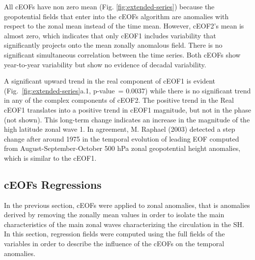 \documentclass[smallextended]{svjour3}       %
\begin{document}
All cEOFs have non zero mean (Fig. \ref{fig:extended-series}) because the geopotential fields that enter into the cEOFs algorithm are anomalies with respect to the zonal mean instead of the time mean.
However, cEOF2's mean is almost zero, which indicates that only cEOF1 includes variability that significantly projects onto the mean zonally anomalous field.
There is no significant simultaneous correlation between the time series.
Both cEOFs show year-to-year variability but show no evidence of decadal variability.

A significant upward trend in the real component of cEOF1 is evident (Fig.~\ref{fig:extended-series}a.1, p-value~= 0.0037) while there is no significant trend in any of the complex components of cEOF2.
The positive trend in the Real cEOF1 translates into a positive trend in cEOF1 magnitude, but not in the phase (not shown).
This long-term change indicates an increase in the magnitude of the high latitude zonal wave 1.
In agreement, M. Raphael (2003) detected a step change after around 1975 in the temporal evolution of leading EOF computed from August-September-October 500 hPa zonal geopotential height anomalies, which is similar to the cEOF1.

\hypertarget{regressions}{%
\subsection{cEOFs Regressions}\label{regressions}}

In the previous section, cEOFs were applied to zonal anomalies, that is anomalies derived by removing the zonally mean values in order to isolate the main characteristics of the main zonal waves characterizing the circulation in the SH.
In this section, regression fields were computed using the full fields of the variables in order to describe the influence of the cEOFs on the temporal anomalies.
\end{document}
